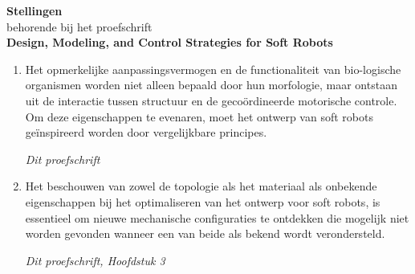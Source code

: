 \documentclass[a5paper]{article}
\renewcommand{\normalsize}{\fontsize{9}{9}\selectfont}
\newcommand{\largesize}{\fontsize{10}{9}\selectfont}
\begin{document}
\clearpage

\begin{center}
\largesize \textbf{Stellingen} \\[0.45em]
\normalsize behorende bij het proefschrift \\[0.45em]
{\textbf{\largesize Design, Modeling, and Control Strategies for Soft Robots}}
\end{center}

\begin{enumerate}
\setlength\itemsep{0.23em}
\item Het opmerkelijke aanpassingsvermogen en de functionaliteit van bio-logische organismen worden niet alleen bepaald door hun morfologie, maar ontstaan uit de interactie tussen structuur en de gecoördineerde motorische controle.\hspace{-1.05mm} Om deze eigenschappen te evenaren, moet het ontwerp van soft robots geïnspireerd worden door vergelijkbare principes.
\begin{flushright}
  \vspace{-2mm}
  \textit{Dit proefschrift}
  \vspace{-1mm}
  \end{flushright}

\item Het beschouwen van zowel de topologie als het materiaal als \mbox{onbekende} eigenschappen bij het optimaliseren van het ontwerp voor soft robots, is essentieel om nieuwe mechanische configuraties te ontdekken die \mbox{mogelijk} niet worden gevonden wanneer een van beide als bekend wordt verondersteld.
\begin{flushright}
  \vspace{-5mm}
  \textit{Dit proefschrift, Hoofdstuk 3}
  \vspace{-1mm}
  \end{flushright}




\end{enumerate}
\end{document}
